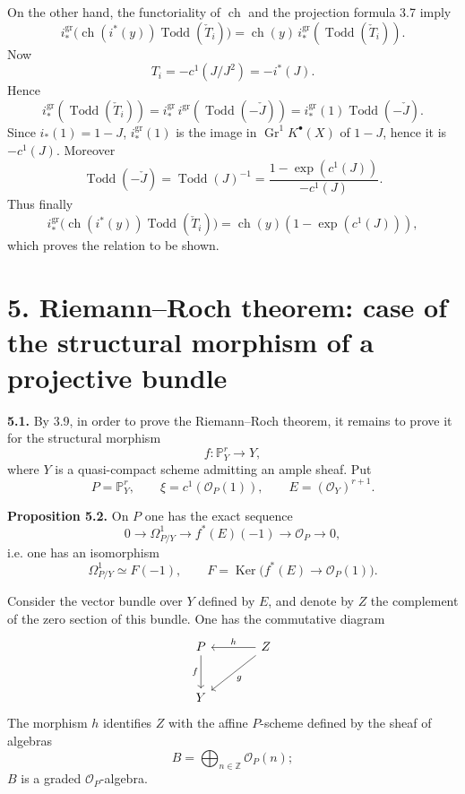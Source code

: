 \documentclass[11pt]{article}
\newcommand{\Gr}{\operatorname{Gr}}
\newcommand{\ch}{\operatorname{ch}}
\newcommand{\Todd}{\operatorname{Todd}}
\providecommand{\ch}{\operatorname{ch}}
\providecommand{\Todd}{\operatorname{Todd}}
\providecommand{\Gr}{\operatorname{Gr}}
\providecommand{\Ker}{\operatorname{Ker}}
\providecommand{\Gr}{\operatorname{G}}
\begin{document}
On the other hand, the functoriality of \(\ch\) and the projection formula 3.7 imply
\[
 i^{\mathrm{gr}}_*\bigl(\ch(i^*(y))\Todd(\check T_i)\bigr)
 =
 \ch(y)\,i^{\mathrm{gr}}_*(\Todd(\check T_i)).
\]
Now
\[
T_i=-c^1(J/J^2)=-i^*(J).
\]
Hence
\[
 i^{\mathrm{gr}}_*(\Todd(\check T_i))
 =
 i^{\mathrm{gr}}_*\,i^{\mathrm{gr}}(\Todd(-\check J))
 =
 i^{\mathrm{gr}}_*(1)\Todd(-\check J).
\]
Since \(i_*(1)=1-J\), \(i^{\mathrm{gr}}_*(1)\) is the image in \(\Gr^1K^{\bullet}(X)\) of \(1-J\), hence it is \(-c^1(J)\). Moreover
\[
 \Todd(-\check J)=\Todd(J)^{-1}
 =
 \frac{1-\exp(c^1(J))}{-c^1(J)}.
\]
Thus finally
\[
 i^{\mathrm{gr}}_*\bigl(\ch(i^*(y))\Todd(\check T_i)\bigr)
 =
 \ch(y)(1-\exp(c^1(J))),
\]
which proves the relation to be shown.

\section*{5. Riemann--Roch theorem: case of the structural morphism of a projective bundle}

\textbf{5.1.} By 3.9, in order to prove the Riemann--Roch theorem, it remains to prove it for the structural morphism
\[
f:\mathbb P^r_Y\longrightarrow Y,
\]
where \(Y\) is a quasi-compact scheme admitting an ample sheaf. Put
\[
P=\mathbb P^r_Y,\qquad \xi=c^1(\mathcal O_P(1)),\qquad E=(\mathcal O_Y)^{r+1}.
\]

\textbf{Proposition 5.2.} On \(P\) one has the exact sequence
\[
0\longrightarrow\Omega^1_{P/Y}\longrightarrow f^*(E)(-1)\longrightarrow\mathcal O_P\longrightarrow0,
\]
i.e. one has an isomorphism
\[
\Omega^1_{P/Y}\simeq F(-1),
\qquad
F=\Ker\bigl(f^*(E)\longrightarrow\mathcal O_P(1)\bigr).
\]

Consider the vector bundle over \(Y\) defined by \(E\), and denote by \(Z\) the complement of the zero section of this bundle. One has the commutative diagram
\[
\begin{tikzcd}[column sep=large,row sep=large]
P \arrow[d,"f"'] & Z \arrow[l,"h"'] \arrow[dl,"g"]\\
Y &
\end{tikzcd}
\]
The morphism \(h\) identifies \(Z\) with the affine \(P\)-scheme defined by the sheaf of algebras
\[
B=\bigoplus_{n\in\mathbb Z}\mathcal O_P(n);
\]
\(B\) is a graded \(\mathcal O_P\)-algebra.
\end{document}

